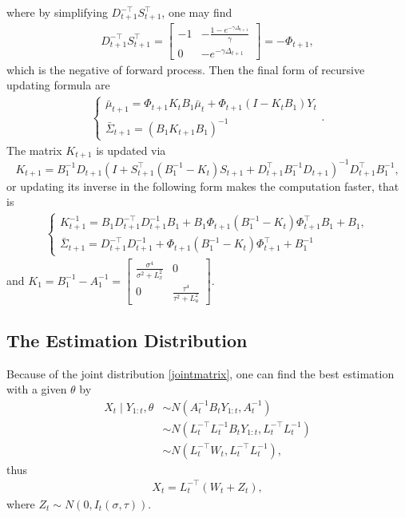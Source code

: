 where by simplifying $D_{t+1}^{-\top}S_{t+1}^\top$, one may find 
\begin{align*}
D_{t+1}^{-\top}S_{t+1}^\top = \begin{bmatrix}
-1 & -\frac{1-e^{-\gamma \Delta_{t+1}}}{\gamma} \\ 0 & - e^{-\gamma \Delta_{t+1}}
\end{bmatrix} = -\Phi_{t+1},
\end{align*}
which is the negative of forward process. Then the final form of recursive updating formula are 
\begin{align}
\begin{cases}
\bar{\mu}_{t+1}=\Phi_{t+1} K_tB_1\bar{\mu}_t + \Phi_{t+1} \left(I-K_tB_1\right)Y_t\\
\bar{\Sigma}_{t+1}=\left( B_1K_{t+1}B_1  \right)^{-1}
\end{cases}.
\end{align}
The matrix $K_{t+1}$ is updated via 
\begin{equation}
K_{t+1} =B_1^{-1}D_{t+1} \left(I+ S_{t+1}^\top \left(B_1^{-1} - K_t\right)  S_{t+1} +D_{t+1}^\top B_1^{-1}D_{t+1}  \right)^{-1}  D_{t+1}^\top B_1^{-1},
\end{equation}
or updating its inverse in the following form makes the computation faster, that is 
\begin{align*}
\begin{cases}
K_{t+1}^{-1} = B_1D_{t+1}^{-\top}D_{t+1}^{-1}B_1 + B_1\Phi_{t+1} \left(B_1^{-1} - K_t\right) \Phi_{t+1}^\top B_1+ B_1,\\
\bar{\Sigma}_{t+1} = D_{t+1}^{-\top}D_{t+1}^{-1}+ \Phi_{t+1} \left(B_1^{-1} - K_t\right) \Phi_{t+1}^\top + B_1^{-1}
\end{cases}
\end{align*}
and $K_1 =B_1^{-1} - A_1^{-1} = \begin{bmatrix}
\frac{\sigma^4}{\sigma^2 +L_x^2} & 0 \\ 0 &\frac{\tau^4}{\tau^2 +L_u^2}
\end{bmatrix} $.



\subsection*{The Estimation Distribution}

Because of the joint distribution \eqref{jointmatrix}, one can find the best estimation with a given $\theta$ by
\begin{align*}
X_t \mid Y_{1:t},\theta &\sim N \left( A_t^{-1}B_tY_{1:t}, A_t^{-1} \right) \\
&\sim N\left(L_t^{-\top}L_t^{-1}B_tY_{1:t},L_t^{-\top}L_t^{-1}\right)\\
&\sim N\left(L_t^{-\top}W_t,L_t^{-\top}L_t^{-1}\right),
\end{align*}
thus
\begin{align*}
X_t = L_t^{-\top}\left(W_t+Z_t\right),
\end{align*}
where $Z_t \sim N\left(0, I_t\left(\sigma,\tau\right) \right)$.


